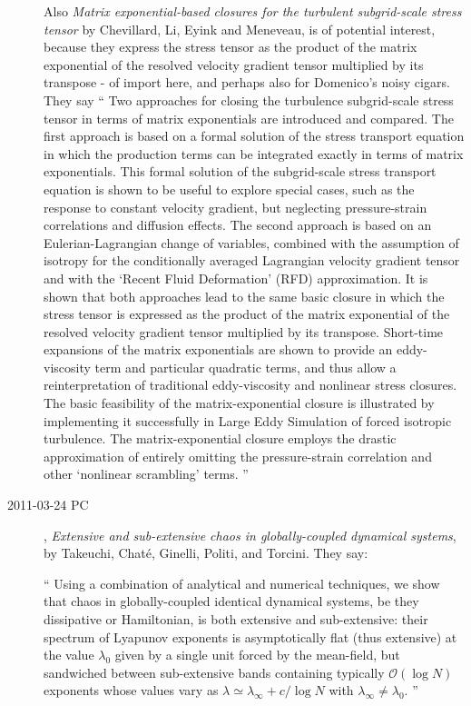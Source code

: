 \begin{description}
Also \emph{Matrix exponential-based closures for 		the turbulent
subgrid-scale stress tensor} by Chevillard, Li, Eyink and  Meneveau, is
of potential interest, because they express the stress tensor as the
product of the matrix exponential of the resolved velocity gradient
tensor multiplied by its transpose - of import here, and perhaps also for
Domenico's noisy cigars. They say ``
Two approaches for closing the turbulence subgrid-scale stress tensor in
terms of matrix exponentials are introduced and compared. The first
approach is based on a formal solution of the stress transport equation
in which the production terms can be integrated exactly in terms of
matrix exponentials. This formal solution of the subgrid-scale stress
transport equation is shown to be useful to explore special cases, such
as the response to constant velocity gradient, but neglecting
pressure-strain correlations and diffusion effects. The second approach
is based on an Eulerian-Lagrangian change of variables, combined with the
assumption of isotropy for the conditionally averaged Lagrangian velocity
gradient tensor and with the `Recent Fluid Deformation' (RFD)
approximation. It is shown that both approaches lead to the same basic
closure in which the stress tensor is expressed as the product of the
matrix exponential of the resolved velocity gradient tensor multiplied by
its transpose. Short-time expansions of the matrix exponentials are shown
to provide an eddy-viscosity term and particular quadratic terms, and
thus allow a reinterpretation of traditional eddy-viscosity and nonlinear
stress closures. The basic feasibility of the matrix-exponential closure
is illustrated by implementing it successfully in Large Eddy Simulation
of forced isotropic turbulence. The matrix-exponential closure employs
the drastic approximation of entirely omitting the pressure-strain
correlation and other `nonlinear scrambling' terms.
''

\item[2011-03-24 PC] ,
\emph{Extensive and sub-extensive chaos in globally-coupled dynamical systems},
by Takeuchi, Chat\'e, Ginelli, Politi, and Torcini. They say:

``
Using a combination of analytical and numerical techniques, we show that
chaos in globally-coupled identical dynamical systems, be they
dissipative or Hamiltonian, is both extensive and sub-extensive: their
spectrum of Lyapunov exponents is asymptotically flat (thus extensive) at
the value $\lambda_0$ given by a single unit forced by the mean-field,
but sandwiched between sub-extensive bands containing typically
$\mathcal{O}(\log N)$ exponents whose values vary as $\lambda \simeq
\lambda_\infty + c/\log N$ with $\lambda_\infty \neq \lambda_0$.
''


\end{description}
